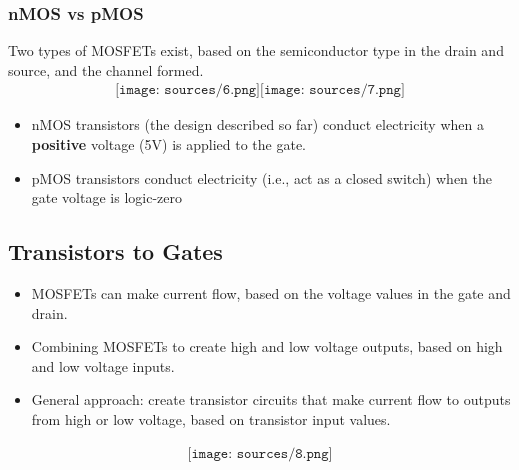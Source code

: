 \documentclass[12pt]{article}
\theoremstyle{definition}
\begin{document}
\subsubsection{nMOS vs pMOS}
Two types of MOSFETs exist, based on the semiconductor type in the drain and source, and the channel formed.
\begin{align*}
    \texttt{[image: sources/6.png]}
    \texttt{[image: sources/7.png]}
\end{align*}
\begin{itemize}
    \item nMOS transistors (the design described so far) conduct electricity when a \textbf{positive} voltage (5V) is applied to the gate.
    \item pMOS transistors conduct electricity (i.e., act as a closed switch) when the gate voltage is logic-zero
\end{itemize}
\subsection{Transistors to Gates}
\begin{itemize}
    \item MOSFETs can make current flow, based on the voltage values in the gate and drain.
    \item Combining MOSFETs to create high and low voltage outputs, based on high and low voltage inputs.
    \item General approach: create transistor circuits that make current flow to outputs from high or low voltage, based on transistor input values.
\end{itemize}
\begin{align*}
    \texttt{[image: sources/8.png]}
\end{align*}
\end{document}

